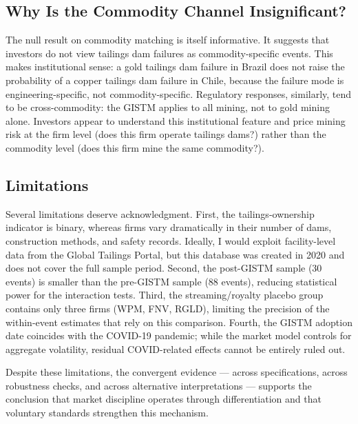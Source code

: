 \documentclass[12pt]{article}
\begin{document}
\subsection{Why Is the Commodity Channel Insignificant?}

The null result on commodity matching is itself informative. It suggests that investors do not view tailings dam failures as commodity-specific events. This makes institutional sense: a gold tailings dam failure in Brazil does not raise the probability of a copper tailings dam failure in Chile, because the failure mode is engineering-specific, not commodity-specific. Regulatory responses, similarly, tend to be cross-commodity: the GISTM applies to all mining, not to gold mining alone. Investors appear to understand this institutional feature and price mining risk at the firm level (does this firm operate tailings dams?) rather than the commodity level (does this firm mine the same commodity?).

\subsection{Limitations}

Several limitations deserve acknowledgment. First, the tailings-ownership indicator is binary, whereas firms vary dramatically in their number of dams, construction methods, and safety records. Ideally, I would exploit facility-level data from the Global Tailings Portal, but this database was created in 2020 and does not cover the full sample period. Second, the post-GISTM sample (30 events) is smaller than the pre-GISTM sample (88 events), reducing statistical power for the interaction tests. Third, the streaming/royalty placebo group contains only three firms (WPM, FNV, RGLD), limiting the precision of the within-event estimates that rely on this comparison. Fourth, the GISTM adoption date coincides with the COVID-19 pandemic; while the market model controls for aggregate volatility, residual COVID-related effects cannot be entirely ruled out.

Despite these limitations, the convergent evidence --- across specifications, across robustness checks, and across alternative interpretations --- supports the conclusion that market discipline operates through differentiation and that voluntary standards strengthen this mechanism.


\end{document}

